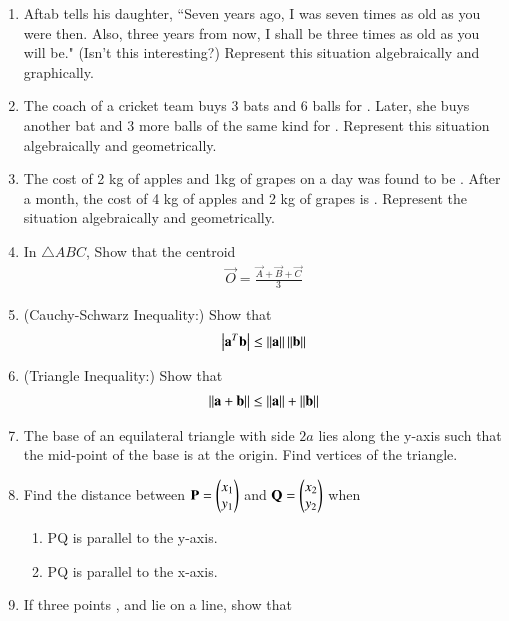 \renewcommand{\theequation}{\theenumi}
\begin{enumerate}[label=\arabic*.,ref=\thesubsection.\theenumi]

\item Aftab tells his daughter, ``Seven years ago, I was seven times as old as you were then. Also, three years from now, I shall be three times as old as you will be." (Isn’t this interesting?) Represent this situation algebraically and graphically.
\item  The coach of a cricket team buys 3 bats and 6 balls for . Later, she buys another bat and 3 more balls of the same kind for . Represent this situation algebraically and geometrically.
\item  The cost of 2 kg of apples and 1kg of grapes on a day was found to be . After a month, the cost of 4 kg of apples and 2 kg of grapes is . Represent the situation algebraically and geometrically.
\item In $\triangle ABC$, Show that the centroid 
\begin{align}
\vec{O} = \frac{\vec{A}+\vec{B}+\vec{C}}{3}
\end{align}
%
\item (Cauchy-Schwarz Inequality:) Show that 
%
\begin{align}
\left\vert\mathbf{a}^T\mathbf{b}\right\vert \le \left\lVert\mathbf{a}\right\rVert\left\lVert\mathbf{b}\right\rVert
\end{align}
%
%
\item (Triangle Inequality:) Show that 
%
\begin{align}
\left\lVert\mathbf{a}+\mathbf{b}\right\rVert \le \left\lVert\mathbf{a}\right\rVert+\left\lVert\mathbf{b}\right\rVert
\end{align}
%
%
\item The base of an equilateral triangle with side $2a$ lies along the y-axis such that the mid-point of the base is at the origin. Find vertices of the triangle.
\item Find the distance between $\mathbf{P}= \begin{pmatrix}x_1\\ y_1\end{pmatrix}$ and $\mathbf{Q} =\begin{pmatrix}x_2\\ y_2\end{pmatrix}$ when
\begin{enumerate}
\item PQ is parallel to the y-axis.
\item PQ is parallel to the x-axis.
\end{enumerate}
\item If three points ,  and  lie on a line, show that

\end{enumerate}
